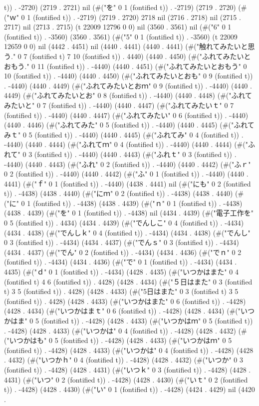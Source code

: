 t)) . -2720) (2719 . 2721) nil (#("を" 0 1 (fontified t)) . -2719) (2719 . 2720) (#("ｗ" 0 1 (fontified t)) . -2719) (2719 . 2720) 2718 nil (2716 . 2718) nil (2715 . 2717) nil (2713 . 2715) (t 22009 12796 0 0) nil (3560 . 3561) nil (#("6" 0 1 (fontified t)) . -3560) (3560 . 3561) (#("5" 0 1 (fontified t)) . -3560) (t 22009 12659 0 0) nil (4442 . 4451) nil (4440 . 4441) (4440 . 4441) (#("触れてみたいと思う." 0 7 (fontified t) 7 10 (fontified t)) . 4440) (4440 . 4450) (#("ふれてみたいとおもう." 0 11 (fontified t)) . -4440) (4440 . 4451) (#("ふれてみたいとおもう" 0 10 (fontified t)) . -4440) (4440 . 4450) (#("ふれてみたいとおも" 0 9 (fontified t)) . -4440) (4440 . 4449) (#("ふれてみたいとおｍ" 0 9 (fontified t)) . -4440) (4440 . 4449) (#("ふれてみたいとお" 0 8 (fontified t)) . -4440) (4440 . 4448) (#("ふれてみたいと" 0 7 (fontified t)) . -4440) (4440 . 4447) (#("ふれてみたいｔ" 0 7 (fontified t)) . -4440) (4440 . 4447) (#("ふれてみたい" 0 6 (fontified t)) . -4440) (4440 . 4446) (#("ふれてみた" 0 5 (fontified t)) . -4440) (4440 . 4445) (#("ふれてみｔ" 0 5 (fontified t)) . -4440) (4440 . 4445) (#("ふれてみ" 0 4 (fontified t)) . -4440) (4440 . 4444) (#("ふれてｍ" 0 4 (fontified t)) . -4440) (4440 . 4444) (#("ふれて" 0 3 (fontified t)) . -4440) (4440 . 4443) (#("ふれｔ" 0 3 (fontified t)) . -4440) (4440 . 4443) (#("ふれ" 0 2 (fontified t)) . -4440) (4440 . 4442) (#("ふｒ" 0 2 (fontified t)) . -4440) (4440 . 4442) (#("ふ" 0 1 (fontified t)) . -4440) (4440 . 4441) (#("ｆ" 0 1 (fontified t)) . -4440) (4438 . 4441) nil (#("にも" 0 2 (fontified t)) . -4438) (4438 . 4440) (#("にｍ" 0 2 (fontified t)) . -4438) (4438 . 4440) (#("に" 0 1 (fontified t)) . -4438) (4438 . 4439) (#("ｎ" 0 1 (fontified t)) . -4438) (4438 . 4439) (#("を" 0 1 (fontified t)) . -4438) nil (4434 . 4439) (#("電子工作を" 0 5 (fontified t)) . 4434) (4434 . 4439) (#("でんしこ" 0 4 (fontified t)) . -4434) (4434 . 4438) (#("でんしｋ" 0 4 (fontified t)) . -4434) (4434 . 4438) (#("でんし" 0 3 (fontified t)) . -4434) (4434 . 4437) (#("でんｓ" 0 3 (fontified t)) . -4434) (4434 . 4437) (#("でん" 0 2 (fontified t)) . -4434) (4434 . 4436) (#("でｎ" 0 2 (fontified t)) . -4434) (4434 . 4436) (#("で" 0 1 (fontified t)) . -4434) (4434 . 4435) (#("ｄ" 0 1 (fontified t)) . -4434) (4428 . 4435) (#("いつかはまた" 0 4 (fontified t) 4 6 (fontified t)) . 4428) (4428 . 4434) (#("５日はまた" 0 3 (fontified t) 3 5 (fontified t)) . 4428) (4428 . 4433) (#("5日はまた" 0 3 (fontified t) 3 5 (fontified t)) . 4428) (4428 . 4433) (#("いつかはまた" 0 6 (fontified t)) . -4428) (4428 . 4434) (#("いつかはまｔ" 0 6 (fontified t)) . -4428) (4428 . 4434) (#("いつかはま" 0 5 (fontified t)) . -4428) (4428 . 4433) (#("いつかはｍ" 0 5 (fontified t)) . -4428) (4428 . 4433) (#("いつかは" 0 4 (fontified t)) . -4428) (4428 . 4432) (#("いつかはも" 0 5 (fontified t)) . -4428) (4428 . 4433) (#("いつかはｍ" 0 5 (fontified t)) . -4428) (4428 . 4433) (#("いつかは" 0 4 (fontified t)) . -4428) (4428 . 4432) (#("いつかｈ" 0 4 (fontified t)) . -4428) (4428 . 4432) (#("いつか" 0 3 (fontified t)) . -4428) (4428 . 4431) (#("いつｋ" 0 3 (fontified t)) . -4428) (4428 . 4431) (#("いつ" 0 2 (fontified t)) . -4428) (4428 . 4430) (#("いｔ" 0 2 (fontified t)) . -4428) (4428 . 4430) (#("い" 0 1 (fontified t)) . -4428) (4424 . 4429) nil (4420 . 
